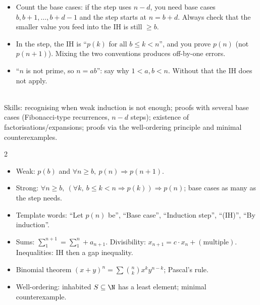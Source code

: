 \begin{warn}
\begin{itemize}
\item Count the base cases: if the step uses $n-d$, you need base cases $b,b+1,\dots,b+d-1$ and the step starts at $n=b+d$. Always check that the smaller value you feed into the IH is still $\ge b$.
\item In the step, the IH is ``$p(k)$ for all $b\le k<n$'', and you prove $p(n)$ (not $p(n+1)$). Mixing the two conventions produces off-by-one errors.
\item ``$n$ is not prime, so $n=ab$'': say why $1<a,b<n$. Without that the IH does not apply.
\end{itemize}
\end{warn}

\begin{planning}
\quad {}\\[3pt]
Skills: recognising when weak induction is not enough; proofs with several base cases (Fibonacci-type recurrences, $n-d$ steps); existence of factorisations/expansions; proofs via the well-ordering principle and minimal counterexamples.
\end{planning}


\begin{multicols}{2}\small
\begin{itemize}
\item Weak: $p(b)$ and $\forall n\ge b,\ p(n)\Rightarrow p(n+1)$.
\item Strong: $\forall n\ge b,\ (\forall k,\ b\le k<n\Rightarrow p(k))\Rightarrow p(n)$; base cases as many as the step needs.
\item Template words: ``Let $p(n)$ be'', ``Base case'', ``Induction step'', ``(IH)'', ``By induction''.
\item Sums: $\sum_{1}^{n+1}=\sum_1^n+a_{n+1}$. Divisibility: $x_{n+1}=c\cdot x_n+(\text{multiple})$. Inequalities: IH then a gap inequality.
\item Binomial theorem $(x+y)^n=\sum\binom nkx^ky^{n-k}$; Pascal's rule.
\item Well-ordering: inhabited $S\subseteq\N$ has a least element; minimal counterexample.
\end{itemize}
\end{multicols}

